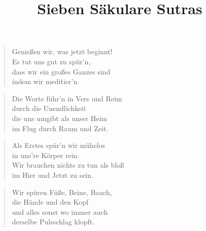 \documentclass[10pt,a4paper]{article}
\begin{document}
\begin{titlepage}
\title{Sieben Säkulare Sutras}
\date{}
\maketitle
%    
\end{titlepage}

\tableofcontents
\pagebreak

\begin{multicols}{2}


\begin{verse}
Genießen wir, was jetzt beginnt! \\
Es tut uns gut zu spür’n, \\
dass wir ein großes Ganzes sind \\
indem wir meditier’n. \\
\end{verse}

\begin{verse}
Die Worte führ’n in Vers und Reim \\
durch die Unendlichkeit \\
die uns umgibt als unser Heim \\
im Flug durch Raum und Zeit. \\
\end{verse}

\begin{verse}
Als Erstes spür’n wir mühelos \\
in uns’re Körper rein. \\
Wir brauchen nichts zu tun als bloß \\
im Hier und Jetzt zu sein. \\
\end{verse}

\begin{verse}
Wir spüren Füße, Beine, Bauch, \\
die Hände und den Kopf \\
und alles sonst wo immer auch \\
derselbe Pulsschlag klopft. \\
\end{verse}


\end{multicols}
\end{document}
